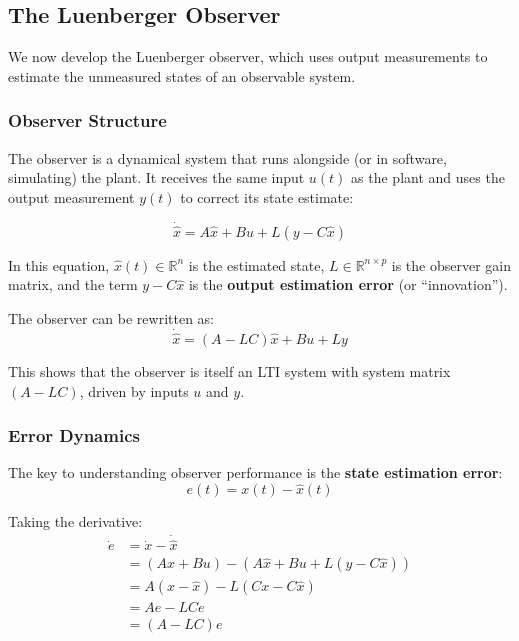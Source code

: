 \subsection{The Luenberger Observer}

We now develop the Luenberger observer, which uses output measurements to estimate the unmeasured states of an observable system.

\subsubsection{Observer Structure}

The observer is a dynamical system that runs alongside (or in software, simulating) the plant. It receives the same input $u(t)$ as the plant and uses the output measurement $y(t)$ to correct its state estimate:

\begin{equation}
\dot{\hat{x}} = A\hat{x} + Bu + L(y - C\hat{x})
\label{eq:luenberger_observer}
\end{equation}

In this equation, $\hat{x}(t) \in \mathbb{R}^n$ is the estimated state, $L \in \mathbb{R}^{n \times p}$ is the observer gain matrix, and the term $y - C\hat{x}$ is the \textbf{output estimation error} (or ``innovation'').

The observer can be rewritten as:
\begin{equation}
\dot{\hat{x}} = (A - LC)\hat{x} + Bu + Ly
\label{eq:observer_standard_form}
\end{equation}

This shows that the observer is itself an LTI system with system matrix $(A-LC)$, driven by inputs $u$ and $y$.

\subsubsection{Error Dynamics}

The key to understanding observer performance is the \textbf{state estimation error}:
\begin{equation}
e(t) = x(t) - \hat{x}(t)
\end{equation}

Taking the derivative:
\begin{align}
\dot{e} &= \dot{x} - \dot{\hat{x}} \\
&= (Ax + Bu) - (A\hat{x} + Bu + L(y - C\hat{x})) \\
&= A(x - \hat{x}) - L(Cx - C\hat{x}) \\
&= Ae - LCe \\
&= (A - LC)e
\label{eq:error_dynamics}
\end{align}

